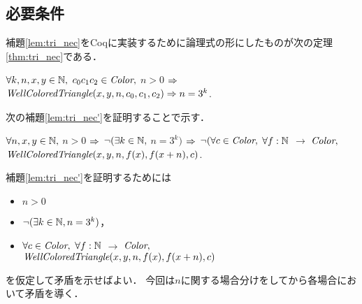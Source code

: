 \subsection{必要条件} \label{sec:nec}
補題\ref{lem:tri_nec}をCoqに実装するために論理式の形にしたものが次の定理\ref{thm:tri_nec}である．
\begin{thm}[必要条件] \label{thm:tri_nec}
  $\forall k, n, x, y \in \mathbb{N},$ $c_0 c_1 c_2 \in \textit{Color},$
  $n > 0$ $\Rightarrow$ 
  $\textit{WellColoredTriangle}(x,y,n,c_0,c_1,c_2) \Rightarrow n = 3 ^ k$.
\end{thm}
次の補題\ref{lem:tri_nec'}を証明することで示す．
\begin{lem} \label{lem:tri_nec'}
  $\forall n, x, y \in \mathbb{N},$ $n > 0$ $\Rightarrow$ 
  $\lnot(\exists k \in \mathbb{N},$ $n = 3 ^ k)$ $\Rightarrow$
  $\lnot( \forall c \in \textit{Color},$
  $\forall f:\mathbb{N}$ $\to$ $\textit{Color},$
  $\textit{WellColoredTriangle}(x,y,n,f(x),f(x+n),c)$.
\end{lem}
補題\ref{lem:tri_nec'}を証明するためには
\begin{itemize}
\item
  $n > 0$
\item
  $\lnot(\exists k \in \mathbb{N}, n = 3 ^ k)$，
\item
  $\forall c \in \textit{Color},$ $\forall f:\mathbb{N}$ $\to$ $\textit{Color},$ \\
  $\textit{WellColoredTriangle}(x,y,n,f(x),f(x+n),c)$
\end{itemize}
を仮定して矛盾を示せばよい．
今回は$n$に関する場合分けをしてから各場合において矛盾を導く．
